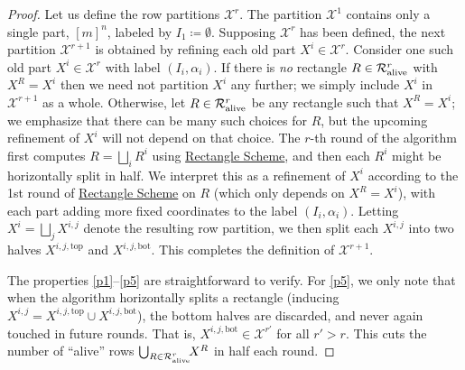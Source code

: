\documentclass{toc}
\newcommand{\rectscheme}{\hyperref[alg:partition]{Rectangle Scheme}\xspace}
\newcommand{\calR}{\mathcal{R}}
\newcommand{\calX}{\mathcal{X}}
\newcommand{\allX}{[m]^n}
\newcommand{\alive}{\text{\upshape alive}}
\newcommand{\topp}{\text{top}}
\newcommand{\bott}{\text{bot}}
\begin{document}
\begin{proof}
Let us define the row partitions $\calX^r$.
The partition $\calX^1$ contains only a single part, $\allX$, labeled by $I_1\coloneqq \emptyset$. Supposing $\calX^r$ has been defined, the next partition $\calX^{r+1}$ is obtained by refining each old part $X^i\in\calX^r$. Consider one such old part $X^i\in\calX^r$ with label $(I_i,\alpha_i)$. If there is \emph{no} rectangle $R\in\calR^r_{\alive}$ with $X^R=X^i$ then we need not partition $X^i$ any further; we simply include $X^i$ in $\calX^{r+1}$ as a whole. Otherwise, let $R\in\calR^r_{\alive}$ be any rectangle such that $X^R=X^i$; we emphasize that there can be many such choices for $R$, but the upcoming refinement of $X^i$ will not depend on that choice. The $r$-th round of the algorithm first computes $R=\bigsqcup_i R^i$ using \rectscheme, and then each $R^i$ might be horizontally split in half. We interpret this as a refinement of $X^i$ according to the 1st round of \rectscheme on $R$ (which only depends on $X^R=X^i$), with each part adding more fixed coordinates to the label $(I_i, \alpha_i)$. Letting $X^i=\bigsqcup_j X^{i,j}$ denote the resulting row partition, we then split each $X^{i,j}$ into two halves $X^{i,j,\topp}$ and $X^{i,j,\bott}$. This completes the definition of $\calX^{r+1}$.

The properties \ref{p1}--\ref{p5} are straightforward to verify. For \ref{p5}, we only note that when the algorithm horizontally splits a rectangle (inducing $X^{i,j}=X^{i,j,\topp}\cup X^{i,j,\bott}$), the bottom halves are discarded, and never again touched in future rounds. That is, $X^{i,j,\bott}\in\calX^{r'}$ for all $r'>r$. This cuts the number of ``alive'' rows $\bigcup_{R\in\calR^r_{\alive}}\!\!X^R$ in half each round.
\end{proof}
\end{document}
